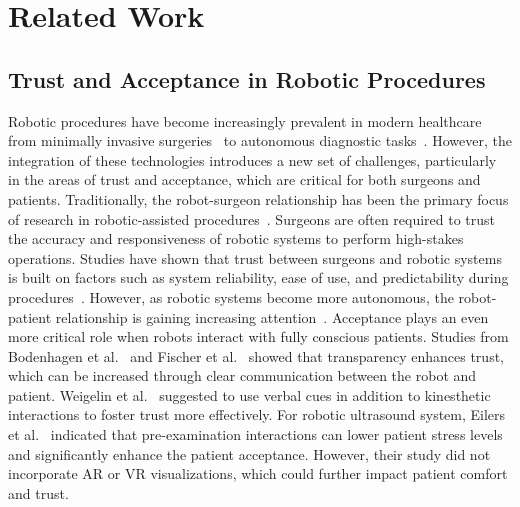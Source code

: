 \section{Related Work}\label{sec:RelatedWork}

\subsection{Trust and Acceptance in Robotic Procedures}

Robotic procedures have become increasingly prevalent in modern healthcare from minimally invasive surgeries~\cite{mack2001minimally,vitiello2012emerging} to autonomous diagnostic tasks~\cite{roshan2022robotic,jiang2023robotic}. However, the integration of these technologies introduces a new set of challenges, particularly in the areas of trust and acceptance, which are critical for both surgeons and patients.
Traditionally, the robot-surgeon relationship has been the primary focus of research in robotic-assisted procedures~\cite{mcdermott2020gender,sierra2021expectations,vichitkraivin2021factors}. Surgeons are often required to trust the accuracy and responsiveness of robotic systems to perform high-stakes operations. Studies have shown that trust between surgeons and robotic systems is built on factors such as system reliability, ease of use, and predictability during procedures~\cite{devito2010clinical,benmessaoud2011facilitators,chatterjee2024advancements,patel2024technical}. However, as robotic systems become more autonomous, the robot-patient relationship is gaining increasing attention~\cite{szabo2024robots}. Acceptance plays an even more critical role when robots interact with fully conscious patients. Studies from Bodenhagen et al.~\cite{bodenhagen2017influence} and Fischer et al.~\cite{fischer2018increasing} showed that transparency enhances trust, which can be increased through clear communication between the robot and patient. Weigelin et al.~\cite{weigelin2018trust} suggested to use verbal cues in addition to kinesthetic interactions to foster trust more effectively. For robotic ultrasound system, Eilers et al.~\cite{eilers2023importance} indicated that pre-examination interactions can lower patient stress levels and significantly enhance the patient acceptance. However, their study did not incorporate AR or VR visualizations, which could further impact patient comfort and trust. 

